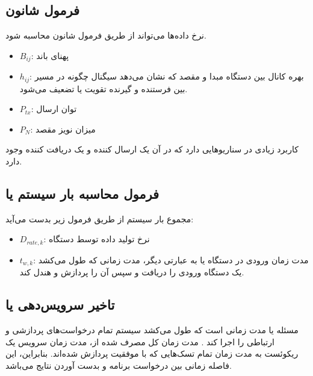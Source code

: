 \subsection{فرمول شانون}

نرخ داده‌ها می‌تواند از طریق فرمول شانون محاسبه شود.


\begin{itemize}
    \item $B_{ij}$: پهنای باند
    \item $h_{ij}$: بهره کانال بین دستگاه مبدا و مقصد که نشان می‌دهد سیگنال
    چگونه در مسیر بین فرستنده و گیرنده تقویت یا تضعیف می‌شود.
    \item $P_{tx}$: توان ارسال
    \item $P_{N}$: میزان نویز مقصد
\end{itemize}

کاربرد زیادی در سناریو‌هایی دارد که در آن یک ارسال کننده و یک دریافت کننده وجود
دارد.

\subsection{فرمول محاسبه بار سیستم یا }

مجموع بار سیستم از طریق فرمول زیر بدست می‌آید:


\begin{itemize}
    \item $D_{rate, k}$: نرخ تولید داده توسط دستگاه 
    \item $t_{w, k}$: مدت زمان ورودی در دستگاه  یا به عبارتی دیگر، مدت
    زمانی که طول می‌کشد یک دستگاه  ورودی را دریافت و سپس آن را پردازش و
    هندل کند.
\end{itemize}

\subsection{تاخیر سرویس‌دهی یا }

مسئله  یا  مدت زمانی
است که طول می‌کشد سیستم  تمام درخواست‌های پردازشی و ارتباطی را اجرا کند
. مدت زمان کل مصرف شده از، مدت زمان سرویس
یک ریکوئست به مدت زمان تمام تسک‌هایی که با موفقیت پردازش شده‌اند. بنابراین، این
فاصله زمانی بین درخواست برنامه و بدست آوردن نتایج می‌باشد.

